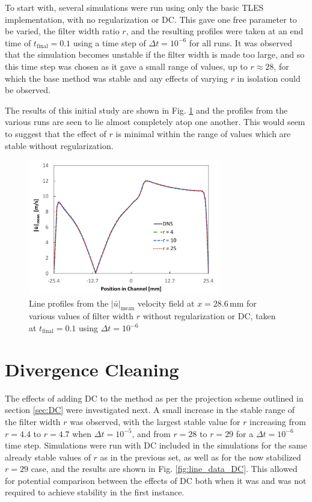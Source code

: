 To start with, several simulations were run using only the basic TLES implementation, with no regularization or DC. This gave one free parameter to be varied, the filter width ratio $r$, and the resulting profiles were taken at an end time of $t_\mathrm{final}=0.1$ using a time step of $\Delta t=10^{-6}$ for all runs. It was observed that the simulation becomes unstable if the filter width is made too large, and so this time step was chosen as it gave a small range of values, up to $r\approx 28$, for which the base method was stable and any effects of varying $r$ in isolation could be observed.

The results of this initial study are shown in Fig. \ref{fig:line_data_no_reg} and the profiles from the various runs are seen to lie almost completely atop one another. This would seem to suggest that the effect of $r$ is minimal within the range of values which are stable without regularization.

\begin{figure}[!htb]
\centering
\includegraphics[width=0.75\textwidth]{figures/line_data_no_reg.pdf}
\caption{Line profiles from the $|\bar{u}|_{\mathrm{mean}}$ velocity field at $x=28.6\,\mathrm{mm}$ for various values of filter width $r$ without regularization or DC, taken at $t_\mathrm{final}=0.1$ using $\Delta t=10^{-6}$}
\label{fig:line_data_no_reg}
\end{figure}

\section{Divergence Cleaning}

The effects of adding DC to the method as per the projection scheme outlined in section \ref{sec:DC} were investigated next. A small increase in the stable range of the filter width $r$ was observed, with the largest stable value for $r$ increasing from $r=4.4$ to $r=4.7$ when $\Delta t=10^{-5}$, and from $r=28$ to $r=29$ for a $\Delta t=10^{-6}$ time step. Simulations were run with DC included in the simulations for the same already stable values of $r$ as in the previous set, as well as for the now stabilized $r=29$ case, and the results are shown in Fig. \ref{fig:line_data_DC}. This allowed for potential comparison between the effects of DC both when it was and was not required to achieve stability in the first instance.

